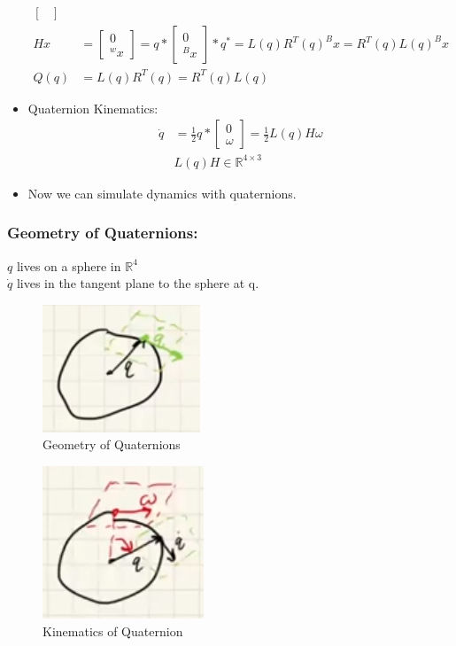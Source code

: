 \begin{itemize}
\begin{align}
\begin{bmatrix}
        \end{bmatrix} \\
        Hx & = \begin{bmatrix}
            0 \\ ^w x
        \end{bmatrix} = q * \begin{bmatrix}
            0 \\ ^B x
        \end{bmatrix} * q^* = L(q) R^T(q) ^B x = R^T(q) L(q) ^B x \\
        Q(q) & = L(q) R^T(q) = R^T(q) L(q)
    \end{align}
    \item Quaternion Kinematics:
    \begin{align}
        \dot q & = \frac{1}{2} q * \begin{bmatrix}
            0 \\ \omega
        \end{bmatrix} = \frac{1}{2} L(q) H \omega \\
        & L(q) H \in \mathbb{R}^{4 \times 3}
    \end{align}
    \item Now we can simulate dynamics with quaternions.
\end{itemize}

\subsubsection{Geometry of Quaternions:}

$q$ lives on a sphere in $\mathbb{R}^4$ \\
$\dot q$ lives in the tangent plane to the sphere at q. \\

\begin{figure}
    \centering
    \includegraphics[width=0.2\linewidth]{L11_Images/F3.PNG}
    \caption{Geometry of Quaternions}
    \label{fig:l11f3}
\end{figure}

\begin{figure}
    \centering
    \includegraphics[width=0.2\linewidth]{L11_Images/F4.PNG}
    \caption{Kinematics of Quaternion}
    \label{fig:l11f4}
\end{figure}


